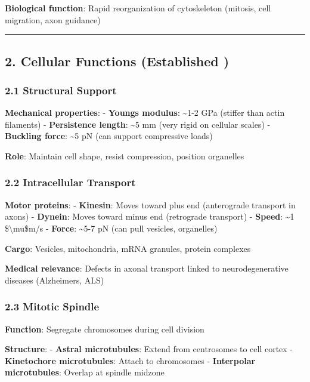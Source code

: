 \textbf{Biological function}: Rapid reorganization of cytoskeleton
(mitosis, cell migration, axon guidance)

\begin{center}\rule{0.5\linewidth}{0.5pt}\end{center}

\subsection{2. Cellular Functions (Established
)}\label{cellular-functions-established}

\subsubsection{2.1 Structural Support}\label{structural-support}

\textbf{Mechanical properties}: - \textbf{Young\textquotesingle s
modulus}: \textasciitilde1-2 GPa (stiffer than actin filaments) -
\textbf{Persistence length}: \textasciitilde5 mm (very rigid on cellular
scales) - \textbf{Buckling force}: \textasciitilde5 pN (can support
compressive loads)

\textbf{Role}: Maintain cell shape, resist compression, position
organelles

\subsubsection{2.2 Intracellular
Transport}\label{intracellular-transport}

\textbf{Motor proteins}: - \textbf{Kinesin}: Moves toward plus end
(anterograde transport in axons) - \textbf{Dynein}: Moves toward minus
end (retrograde transport) - \textbf{Speed}: \textasciitilde1
\$\textbackslash mu\$m/s - \textbf{Force}: \textasciitilde5-7 pN (can
pull vesicles, organelles)

\textbf{Cargo}: Vesicles, mitochondria, mRNA granules, protein complexes

\textbf{Medical relevance}: Defects in axonal transport linked to
neurodegenerative diseases (Alzheimer\textquotesingle s, ALS)

\subsubsection{2.3 Mitotic Spindle}\label{mitotic-spindle}

\textbf{Function}: Segregate chromosomes during cell division

\textbf{Structure}: - \textbf{Astral microtubules}: Extend from
centrosomes to cell cortex - \textbf{Kinetochore microtubules}: Attach
to chromosomes - \textbf{Interpolar microtubules}: Overlap at spindle
midzone

